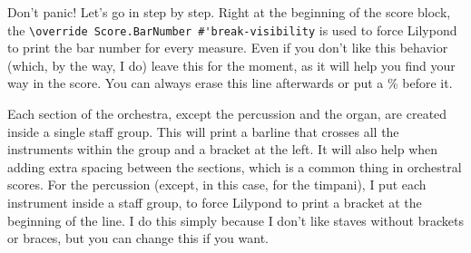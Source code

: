 \documentclass[../../LilyPond-Tutorials]{subfiles}
\begin{document}

Don't panic!
Let's go in step by step.
Right at the beginning of the score block, the \verb|\override Score.BarNumber #'break-visibility| is used to force Lilypond to print the bar number for every measure.
Even if you don't like this behavior (which, by the way, I do) leave this for the moment, as it will help you find your way in the score.
You can always erase this line afterwards or put a \% before it.

Each section of the orchestra, except the percussion and the organ, are created inside a single staff group.
This will print a barline that crosses all the instruments within the group and a bracket at the left.
It will also help when adding extra spacing between the sections, which is a common thing in orchestral scores.
For the percussion (except, in this case, for the timpani), I put each instrument inside a staff group, to force Lilypond to print a bracket at the beginning of the line.
I do this simply because I don't like staves without brackets or braces, but you can change this if you want.
\end{document}
